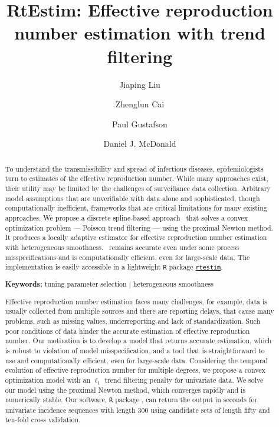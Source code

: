 \documentclass[12pt]{article}
\title{RtEstim: Effective reproduction number estimation with trend filtering}
\author[a,1]{Jiaping Liu}
\author[b]{Zhenglun Cai}
\author[a]{Paul Gustafson}
\author[a]{Daniel J. McDonald}
\affil[a]{Department of Statistics, The University of British Columbia}
\affil[b]{Centre for Health Evaluation and Outcome Sciences, The University of
British Columbia}
\begin{document}
\maketitle

\begin{abstract}
  To understand the transmissibility and spread of infectious diseases,
  epidemiologists turn to estimates of the effective reproduction number.
  While many approaches exist, their utility may be limited by the
  challenges of surveillance data collection. Arbitrary model assumptions
  that are unverifiable with data alone and sophisticated, though
  computationally inefficient, frameworks that
  are critical limitations for many
  existing approaches. We propose a discrete spline-based approach 
  \RtEstim\ that solves a convex optimization problem --- Poisson trend filtering
  --- using the proximal Newton method. 
  It produces a locally adaptive estimator for effective reproduction number 
  estimation with heterogeneous smoothness. 
  \RtEstim\ remains accurate even under some process misspecifications and
  is computationally efficient, even for large-scale data. The 
  implementation is easily accessible in a lightweight \texttt{R} package
  \href{https://dajmcdon.github.io/rtestim/index.html}{\texttt{rtestim}}.

  {\bf Keywords:} tuning parameter selection $|$ heterogeneous smoothness
\end{abstract}

\renewcommand{\abstractname}{Author summary}
\begin{abstract}
  Effective reproduction number estimation faces many challenges, for example, 
  data is usually collected from multiple sources and there are reporting delays, that cause many problems, 
  such as missing values, underreporting and lack of standardization. 
  Such poor conditions of data hinder the accurate estimation of effective reproduction number.  
  Our motivation is to develop a model that returns accurate estimation, which is robust to violation of model misspecification, and a tool that is straightforward to use and computationally efficient, even for large-scale data. 
  Considering the temporal evolution of effective reproduction number for multiple degrees, we propose a convex optimization model with an $\ell_1$ trend filtering penalty for univariate data. We solve our model using the proximal Newton method, which converges rapidly and is numerically stable. 
  Our software, \texttt{R} package \RtEstim, can return the output in seconds for univariate incidence sequences with length 300 using candidate sets of length fifty and ten-fold cross validation. 
\end{abstract}
\end{document}
